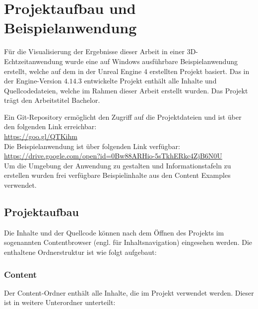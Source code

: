 \chapter{Projektaufbau und Beispielanwendung} \label{ch:Projektaufbau}

Für die Visualisierung der Ergebnisse dieser Arbeit in einer 3D-Echtzeitanwendung wurde eine auf Windows ausführbare Beispielanwendung erstellt, welche auf dem in der Unreal Engine 4 erstellten Projekt basiert. \cite{UnrealTerminology:17} Das in der Engine-Version $4.14.3$ entwickelte Projekt enthält alle Inhalte und Quellcodedateien, welche im Rahmen dieser Arbeit erstellt wurden. Das Projekt trägt den Arbeitstitel \glqq Bachelor\grqq. 

Ein Git-Repository ermöglicht den Zugriff auf die Projektdateien und ist über den folgenden Link erreichbar: \\

\url{https://goo.gl/QTKihm} \\

Die Beispielanwendung ist über folgenden Link verfügbar: \\

\url{https://drive.google.com/open?id=0Bw88ARHio-5sTkhERkc4ZjB6N0U} \\

Um die Umgebung der Anwendung zu gestalten und Informationstafeln zu erstellen wurden frei verfügbare Beispielinhalte aus den Content Examples verwendet. \cite{UnrealContentExamples:17}

\section{Projektaufbau}

Die Inhalte und der Quellcode können nach dem Öffnen des Projekts im sogenannten Contentbrowser (engl. für Inhaltsnavigation) eingesehen werden. Die enthaltene Ordnerstruktur ist wie folgt aufgebaut:

\subsection{Content}

Der Content-Ordner enthält alle Inhalte, die im Projekt verwendet werden. Dieser ist in weitere Unterordner unterteilt:

